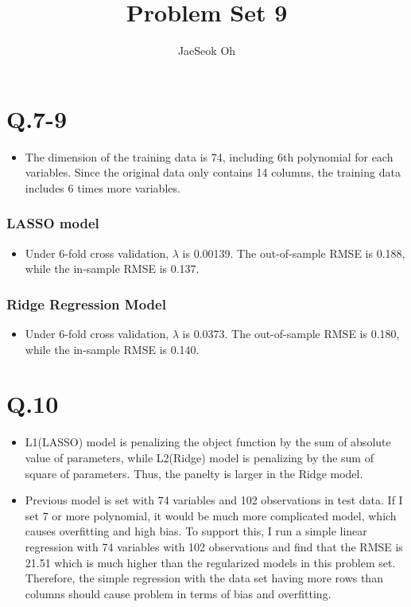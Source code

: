 \documentclass{article}
\title{Problem Set 9}
\author{JaeSeok Oh}
\begin{document}
\begin{Large}
	\maketitle
	
\section*{Q.7-9}
	\begin{itemize}
		\item The dimension of the training data is 74, including 6th polynomial for each variables. Since the original data only contains 14 columns, the training data includes 6 times more variables.
	\end{itemize}
\subsubsection*{LASSO model}
	\begin{itemize}
		\item Under 6-fold cross validation, $ \lambda $ is 0.00139. The out-of-sample RMSE is 0.188, while the in-sample RMSE is 0.137.
	\end{itemize}
\subsubsection*{Ridge Regression Model}
	\begin{itemize}
		\item Under 6-fold cross validation, $ \lambda $ is 0.0373. The out-of-sample RMSE is 0.180, while the in-sample RMSE is 0.140.
	\end{itemize}

\section*{Q.10}
	\begin{itemize}
		\item L1(LASSO) model is penalizing the object function by the sum of absolute value of parameters, while L2(Ridge) model is penalizing by the sum of square of parameters. Thus, the panelty is larger in the Ridge model.
		\item Previous model is set with 74 variables and 102 observations in test data. If I set 7 or more polynomial, it would be much more complicated model, which causes overfitting and high bias. To support this, I run a simple linear regression with 74 variables with 102 observations and find that the RMSE is 21.51 which is much higher than the regularized models in this problem set. Therefore, the simple regression with the data set having more rows than columns should cause problem in terms of bias and overfitting.
	\end{itemize}
	
\end{Large}
\end{document}
